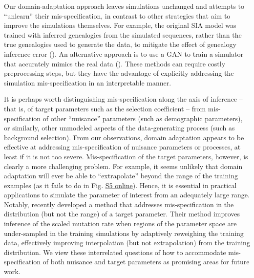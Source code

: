 Our domain-adaptation approach leaves simulations unchanged and attempts to “unlearn” their mis-specification, in contrast to other strategies that aim to improve the simulations themselves. For example, the original \ac{SIA} model was trained with inferred genealogies from the simulated sequences, rather than the true genealogies used to generate the data, to mitigate the effect of genealogy inference error (\cite{hejase_deep-learning_2022}). An alternative approach is to use a \ac{GAN} to train a simulator that accurately mimics the real data (\cite{wang_automatic_2021}). These methods can require costly preprocessing steps, but they have the advantage of explicitly addressing the simulation mis-specification in an interpretable manner.

It is perhaps worth distinguishing mis-specification along the axis of inference -- that is, of target parameters such as the selection coefficient -- from mis-specification of other “nuisance” parameters (such as demographic parameters), or similarly, other unmodeled aspects of the data-generating process (such as background selection). From our observations, domain adaptation appears to be effective at addressing mis-specification of nuisance parameters or processes, at least if it is not too severe. Mis-specification of the target parameters, however, is clearly a more challenging problem. For example, it seems unlikely that domain adaptation will ever be able to “extrapolate” beyond the range of the training examples (as it fails to do in Fig. \href{https://journals.plos.org/plosgenetics/article?id=10.1371/journal.pgen.1011032#sec018}{S5 online}). Hence, it is essential in practical applications to simulate the parameter of interest from an adequately large range. Notably, \cite{burger_neural_2022} recently developed a method that addresses mis-specification in the distribution (but not the range) of a target parameter. Their method improves inference of the scaled mutation rate when regions of the parameter space are under-sampled in the training simulations by adaptively reweighing the training data, effectively improving interpolation (but not extrapolation) from the training distribution. We view these interrelated questions of how to accommodate mis-specification of both nuisance and target parameters as promising areas for future work.

